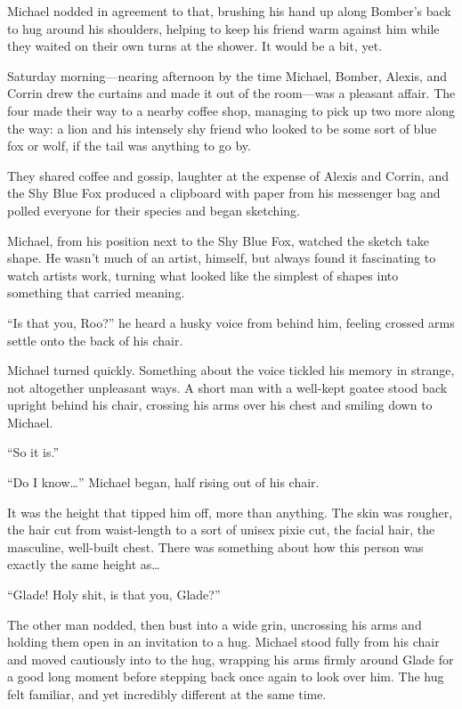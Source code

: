 Michael nodded in agreement to that, brushing his hand up along Bomber's back to hug around his shoulders, helping to keep his friend warm against him while they waited on their own turns at the shower. It would be a bit, yet.

\secdiv{}

Saturday morning---nearing afternoon by the time Michael, Bomber, Alexis, and Corrin drew the curtains and made it out of the room---was a pleasant affair. The four made their way to a nearby coffee shop, managing to pick up two more along the way: a lion and his intensely shy friend who looked to be some sort of blue fox or wolf, if the tail was anything to go by.

They shared coffee and gossip, laughter at the expense of Alexis and Corrin, and the Shy Blue Fox produced a clipboard with paper from his messenger bag and polled everyone for their species and began sketching.

Michael, from his position next to the Shy Blue Fox, watched the sketch take shape. He wasn't much of an artist, himself, but always found it fascinating to watch artists work, turning what looked like the simplest of shapes into something that carried meaning.

``Is that you, Roo?'' he heard a husky voice from behind him, feeling crossed arms settle onto the back of his chair.

Michael turned quickly. Something about the voice tickled his memory in strange, not altogether unpleasant ways. A short man with a well-kept goatee stood back upright behind his chair, crossing his arms over his chest and smiling down to Michael.

``So it is.''

``Do I know\ldots{}'' Michael began, half rising out of his chair.

It was the height that tipped him off, more than anything. The skin was rougher, the hair cut from waist-length to a sort of unisex pixie cut, the facial hair, the masculine, well-built chest. There was something about how this person was exactly the same height as\ldots{}

``Glade! Holy shit, is that you, Glade?''

The other man nodded, then bust into a wide grin, uncrossing his arms and holding them open in an invitation to a hug. Michael stood fully from his chair and moved cautiously into to the hug, wrapping his arms firmly around Glade for a good long moment before stepping back once again to look over him. The hug felt familiar, and yet incredibly different at the same time.

